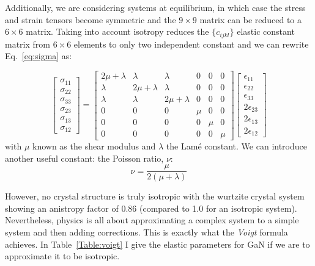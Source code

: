 Additionally, we are considering systems at equilibrium, in which case the stress and strain tensors become symmetric and the $9 \times 9$ matrix can be reduced to a $6 \times 6$ matrix. Taking into account isotropy reduces the $\{c_{ijkl}\}$ elastic constant matrix from $6\times6$ elements to only two independent constant and we can rewrite Eq.~\ref{eq:sigma} as:

\begin{equation}
\begin{bmatrix}
\sigma_{11}\\
\sigma_{22}\\
\sigma_{33}\\
\sigma_{23}\\
\sigma_{13}\\
\sigma_{12}
\end{bmatrix}
=
\begin{bmatrix}
2\mu+\lambda  &  \lambda       &  \lambda       &  0 & 0 & 0\\
\lambda       &  2\mu+\lambda  &  \lambda       &  0 & 0 & 0\\
\lambda       &       \lambda  &  2\mu+\lambda  &  0 & 0 & 0\\
 0            &       0        &  0             &\mu & 0 & 0\\
 0            &       0        &  0             &0   &\mu& 0\\
 0            &       0        &  0             &0   & 0 & \mu
\end{bmatrix}
%
\begin{bmatrix}
\epsilon_{11}\\
\epsilon_{22}\\
\epsilon_{33}\\
2\epsilon_{23}\\
2\epsilon_{13}\\
2\epsilon_{12}
\end{bmatrix}
\end{equation}
with $\mu$ known as the shear modulus and $\lambda$ the Lam\'{e} constant. We can introduce another useful constant: the Poisson ratio, $\nu$:
\begin{equation*}
 \nu = \frac{\mu}{2(\mu + \lambda )}   
\end{equation*}


However, no crystal structure is truly isotropic with the wurtzite crystal system showing an anistropy factor of 0.86 (compared to 1.0 for an isotropic system). Nevertheless, physics is all about approximating a complex system to a simple system and then adding corrections. This is exactly what the \textit{Voigt} formula~\cite{Hirthbook} achieves. In Table~\ref{Table:voigt} I give the elastic parameters for GaN if we are to approximate it to be isotropic. 

